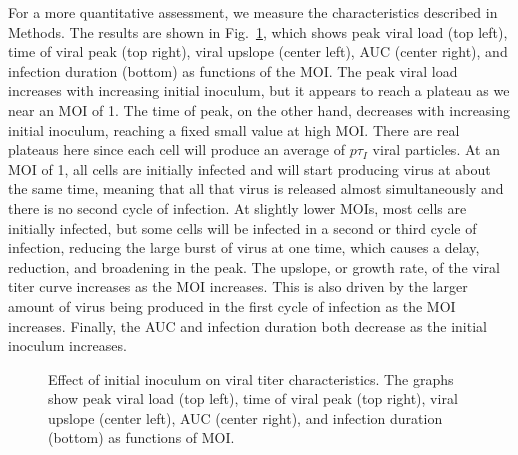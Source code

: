 For a more quantitative assessment, we measure the characteristics described in Methods. The results are shown in Fig.\ \ref{results}, which shows peak viral load (top left), time of viral peak (top right), viral upslope (center left), AUC (center right), and infection duration (bottom) as functions of the MOI. The peak viral load increases with increasing initial inoculum, but it appears to reach a plateau as we near an MOI of 1. The time of peak, on the other hand, decreases with increasing initial inoculum, reaching a fixed small value at high MOI. There are real plateaus here since each cell will produce an average of $p\tau_I$ viral particles. At an MOI of 1, all cells are initially infected and will start producing virus at about the same time, meaning that all that virus is released almost simultaneously and there is no second cycle of infection. At slightly lower MOIs, most cells are initially infected, but some cells will be infected in a second or third cycle of infection, reducing the large burst of virus at one time, which causes a delay, reduction, and broadening in the peak. The upslope, or growth rate, of the viral titer curve increases as the MOI increases. This is also driven by the larger amount of virus being produced in the first cycle of infection as the MOI increases. Finally, the AUC and infection duration both decrease as the initial inoculum increases.  
\begin{figure}[!h]
\begin{center}
\caption{Effect of initial inoculum on viral titer characteristics. The graphs show peak viral load (top left), time of viral peak (top right), viral upslope (center left), AUC (center right), and infection duration (bottom) as functions of MOI. \label{results}}
\end{center}
\end{figure}


